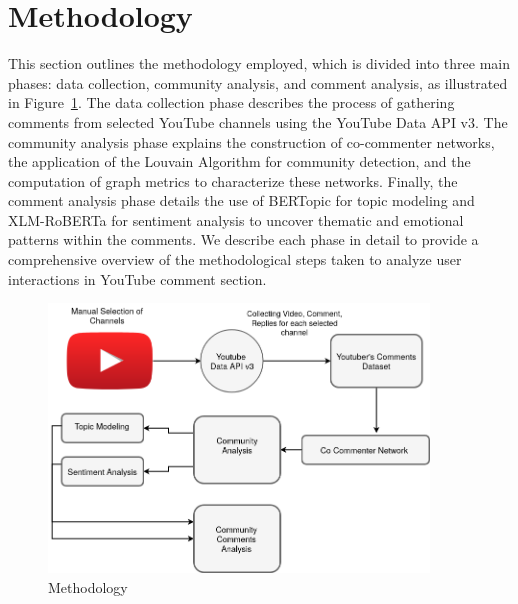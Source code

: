 \documentclass[sigconf]{acmart}
\newcommand{\humberto}[1]{{\color{red}[HTMN: #1]}}
\begin{document}
\section{Methodology}

This section outlines the methodology employed, which is divided into three main phases: 
data collection, community analysis, and comment analysis, as illustrated in Figure~\ref{fig:methodology}. 
The data collection phase describes the process of gathering comments from selected YouTube channels  using the YouTube Data API v3. The community analysis phase explains the construction of co-commenter 
networks, the application of the Louvain Algorithm for community detection, and the computation of 
graph metrics to characterize these networks. Finally, the comment analysis phase details the use of 
BERTopic for topic modeling and XLM-RoBERTa for sentiment analysis to uncover thematic and emotional 
patterns within the comments. We describe each phase in detail to provide a comprehensive overview 
of the methodological steps taken to analyze user interactions in YouTube comment section.


\begin{figure}[t!]
    \centering
    \includegraphics[keepaspectratio,width=0.9\textwidth]{./imgs/tcc_methodology.png}
    \caption{Methodology}
    \label{fig:methodology}
\end{figure}
\end{document}
